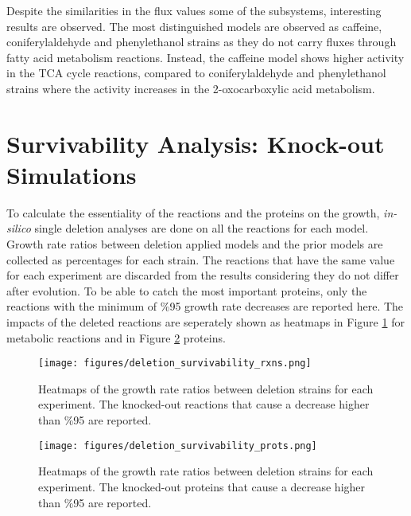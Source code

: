 Despite the similarities in the flux values some of the subsystems, interesting results are observed. The most distinguished models are observed as caffeine, coniferylaldehyde and phenylethanol strains as they do not carry fluxes through fatty acid metabolism reactions. Instead, the caffeine model shows higher activity in the TCA cycle reactions, compared to coniferylaldehyde and phenylethanol strains where the activity increases in the 2-oxocarboxylic acid metabolism.

\section{Survivability Analysis: Knock-out Simulations}
To calculate the essentiality of the reactions and the proteins on the growth, \emph{in-silico} single deletion analyses are done on all the reactions for each model. Growth rate ratios between deletion applied models and the prior models are collected as percentages for each strain. The reactions that have the same value for each experiment are discarded from the results considering they do not differ after evolution. To be able to catch the most important proteins, only the reactions with the minimum of \%95 growth rate decreases are reported here. The impacts of the deleted reactions are seperately shown as heatmaps in Figure \ref{fig:deletion_survivability_rxns} for metabolic reactions and in Figure \ref{fig:deletion_survivability_prots} proteins.

\begin{figure}[H]
  \begin{center}
  \texttt{[image: figures/deletion\_survivability\_rxns.png]}
  \caption[Heatmaps of the growth rate ratios between deletion strains for each experiment. The knocked-out reactions that cause a decrease higher than \%95 are reported.]{Heatmaps of the growth rate ratios between deletion strains for each experiment. The knocked-out reactions that cause a decrease higher than \%95 are reported.}
  \label{fig:deletion_survivability_rxns}
  \end{center}
\end{figure}

\begin{figure}[H]
  \begin{center}
  \texttt{[image: figures/deletion\_survivability\_prots.png]}
  \caption[Heatmaps of the growth rate ratios between deletion strains for each experiment. The knocked-out proteins that cause a decrease higher than \%95 are reported.]{Heatmaps of the growth rate ratios between deletion strains for each experiment. The knocked-out proteins that cause a decrease higher than \%95 are reported.}
  \label{fig:deletion_survivability_prots}
  \end{center}
\end{figure}

